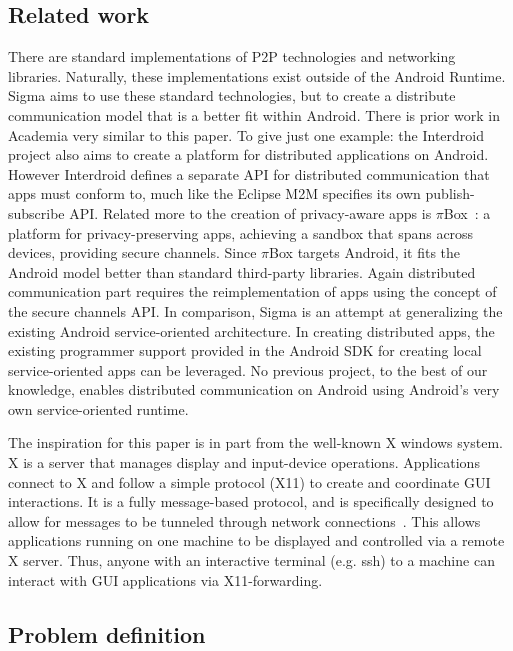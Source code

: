 \documentclass[prodmode]{acmlarge}
\begin{document}
\subsection{Related work}
There are standard implementations of P2P technologies and networking libraries. Naturally, these implementations exist outside of the Android Runtime. Sigma aims to use these standard technologies, but to create a distribute communication model that is a better fit within Android. There is prior work in Academia very similar to this paper. To give just one example: the Interdroid~\cite{Interdroid} project also aims to create a platform for distributed applications on Android. However Interdroid defines a separate API for distributed communication that apps must conform to, much like the Eclipse M2M specifies its own publish-subscribe API. Related more to the creation of privacy-aware apps is $\pi$Box~\cite{piBox}: a platform for privacy-preserving apps, achieving a sandbox that spans across devices, providing secure channels. Since $\pi$Box targets Android, it fits the Android model better than standard third-party libraries. Again distributed communication part requires the reimplementation of apps using the concept of the secure channels API. In comparison, Sigma is an attempt at generalizing the existing Android service-oriented architecture. In creating distributed apps, the existing programmer support provided in the Android SDK for creating local service-oriented apps can be leveraged. No previous project, to the best of our knowledge, enables distributed communication on Android using Android's very own service-oriented runtime.

The inspiration for this paper is in part from the well-known X windows system. X is a server that manages display and input-device operations. Applications connect to X and follow a simple protocol (X11) to create and coordinate GUI interactions. It is a fully message-based protocol, and is specifically designed to allow for messages to be tunneled through network connections~\cite{X11}. This allows applications running on one machine to be displayed and controlled via a remote X server. Thus, anyone with an interactive terminal (e.g. ssh) to a machine can interact with GUI applications via X11-forwarding.

\subsection{Problem definition}
\end{document}
